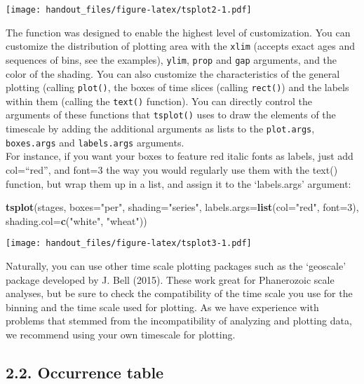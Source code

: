 \documentclass[]{article}
\newenvironment{Shaded}{\begin{snugshade}}{\end{snugshade}}
\newcommand{\KeywordTok}[1]{\textcolor[rgb]{0.13,0.29,0.53}{\textbf{{#1}}}}
\newcommand{\DataTypeTok}[1]{\textcolor[rgb]{0.13,0.29,0.53}{{#1}}}
\newcommand{\DecValTok}[1]{\textcolor[rgb]{0.00,0.00,0.81}{{#1}}}
\newcommand{\StringTok}[1]{\textcolor[rgb]{0.31,0.60,0.02}{{#1}}}
\newcommand{\NormalTok}[1]{{#1}}
\begin{document}
\texttt{[image: handout\_files/figure-latex/tsplot2-1.pdf]}

The function was designed to enable the highest level of customization.
You can customize the distribution of plotting area with the
\texttt{xlim} (accepts exact ages and sequences of bins, see the
examples), \texttt{ylim}, \texttt{prop} and \texttt{gap} arguments, and
the color of the shading. You can also customize the characteristics of
the general plotting (calling \texttt{plot()}, the boxes of time slices
(calling \texttt{rect()}) and the labels within them (calling the
\texttt{text()} function). You can directly control the arguments of
these functions that \texttt{tsplot()} uses to draw the elements of the
timescale by adding the additional arguments as lists to the
\texttt{plot.args}, \texttt{boxes.args} and \texttt{labels.args}
arguments.\\
For instance, if you want your boxes to feature red italic fonts as
labels, just add col=``red'', and font=3 the way you would regularly use
them with the text() function, but wrap them up in a list, and assign it
to the `labels.args' argument:

\begin{Shaded}
\begin{Highlighting}[]
\KeywordTok{tsplot}\NormalTok{(stages, }\DataTypeTok{boxes=}\StringTok{"per"}\NormalTok{, }\DataTypeTok{shading=}\StringTok{"series"}\NormalTok{, }
  \DataTypeTok{labels.args=}\KeywordTok{list}\NormalTok{(}\DataTypeTok{col=}\StringTok{"red"}\NormalTok{, }\DataTypeTok{font=}\DecValTok{3}\NormalTok{), }\DataTypeTok{shading.col=}\KeywordTok{c}\NormalTok{(}\StringTok{"white"}\NormalTok{, }\StringTok{"wheat"}\NormalTok{))}
\end{Highlighting}
\end{Shaded}

\texttt{[image: handout\_files/figure-latex/tsplot3-1.pdf]}

Naturally, you can use other time scale plotting packages such as the
`geoscale' package developed by J. Bell (2015). These work great for
Phanerozoic scale analyses, but be sure to check the compatibility of
the time scale you use for the binning and the time scale used for
plotting. As we have experience with problems that stemmed from the
incompatibility of analyzing and plotting data, we recommend using your
own timescale for plotting.

\subsection{2.2. Occurrence table}\label{occurrence-table}
\end{document}

